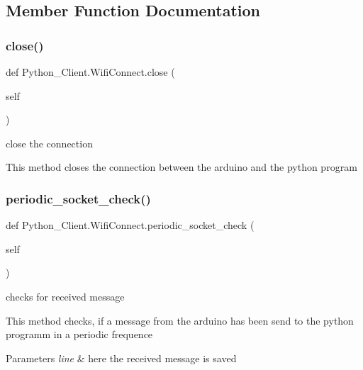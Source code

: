\subsection{Member Function Documentation}
\mbox{\label{class_python___client_1_1_wifi_connect_ac05ef987e930e48c8c5bb8056c2ca68b}} 
\subsubsection{\texorpdfstring{close()}{close()}}
{\footnotesize\ttfamily def Python\+\_\+\+Client.\+Wifi\+Connect.\+close (\begin{DoxyParamCaption}\item[{}]{self }\end{DoxyParamCaption})}



close the connection 

This method closes the connection between the arduino and the python program \mbox{\label{class_python___client_1_1_wifi_connect_a6eb0999228a1fc0e8f76d7aad443b6c5}} 
\subsubsection{\texorpdfstring{periodic\+\_\+socket\+\_\+check()}{periodic\_socket\_check()}}
{\footnotesize\ttfamily def Python\+\_\+\+Client.\+Wifi\+Connect.\+periodic\+\_\+socket\+\_\+check (\begin{DoxyParamCaption}\item[{}]{self }\end{DoxyParamCaption})}



checks for received message 

This method checks, if a message from the arduino has been send to the python programm in a periodic frequence 
\begin{DoxyParams}{Parameters}
{\em line} & here the received message is saved \\
\hline
\end{DoxyParams}
\mbox{\label{class_python___client_1_1_wifi_connect_ad5bac3310c58f99485738c056718a3ca}} 
